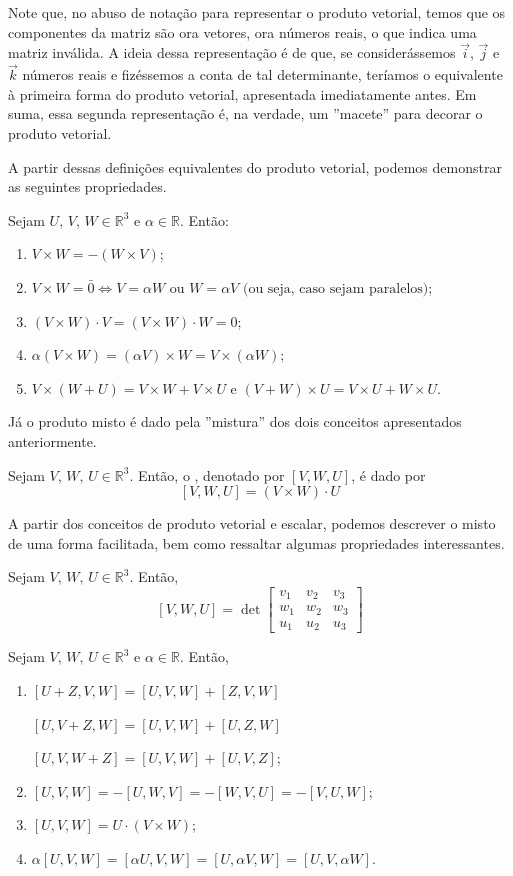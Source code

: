 \documentclass[../main.tex]{subfiles}
\begin{document}
		Note que, no abuso de notação para representar o produto vetorial, temos que os componentes da matriz são ora vetores, ora números reais, o que indica uma matriz inválida. A ideia dessa representação é de que, se considerássemos $\vec i$, $\vec j$ e $\vec k$ números reais e fizéssemos a conta de tal determinante, teríamos o equivalente à primeira forma do produto vetorial, apresentada imediatamente antes. Em suma, essa segunda representação é, na verdade, um ''macete'' para decorar o produto vetorial.
		
		A partir dessas definições equivalentes do produto vetorial, podemos demonstrar as seguintes propriedades.
		\begin{proposicao}
			Sejam $U,\, V,\, W\in \mathbb{R}^3$ e $\alpha \in \mathbb{R}$. Então:
			\begin{enumerate}[label=\roman*)]
				\item $V\times W=-(W\times V)$;
				\item $V\times W=\bar{0}\Leftrightarrow V=\alpha W\text{ ou } W=\alpha V \text{ (ou seja, caso sejam paralelos)}$;
				\item $(V\times W)\cdot V=(V\times W)\cdot W=0$;
				\item $\alpha(V\times W)=(\alpha V)\times W=V\times (\alpha W)$;
				\item $V\times (W+U)=V\times W+V\times U$ e $(V+W)\times U=V\times U+W\times U$.
			\end{enumerate}
		\end{proposicao}
		Já o produto misto é dado pela ''mistura'' dos dois conceitos apresentados anteriormente.
		\begin{definicao}
			Sejam $V,\, W, \, U \in \mathbb{R}^3$. Então, o , denotado por $[V, W, U]$, é dado por
			\[
			[V, W, U]=(V\times W)\cdot U
			\]
		\end{definicao}
		A partir dos conceitos de produto vetorial e escalar, podemos descrever o misto de uma forma facilitada, bem como ressaltar algumas propriedades interessantes.
		\begin{proposicao}
			Sejam $V,\, W, \, U \in \mathbb{R}^3$. Então, 
			\[
			[V, W, U]=\det \begin{bmatrix}
				v_1 & v_2 & v_3\\
				w_1 & w_2 & w_3\\
				u_1 & u_2 & u_3
			\end{bmatrix}
			\]
		\end{proposicao}
		\begin{proposicao}
			Sejam $V,\, W, \, U\in \mathbb{R}^3$ e $\alpha \in \mathbb{R}$. Então,
			\begin{enumerate}[label=\roman*)]
				\item $[U+Z,V,W]=[U,V,W]+[Z,V,W]$
				
				$[U,V+Z,W]=[U,V,W]+[U,Z,W]$
				
				$[U,V,W+Z]=[U,V,W]+[U,V,Z]$;
				\item $[U,V,W]=-[U,W,V]=-[W,V,U]=-[V,U,W]$;
				\item $[U,V,W]=U\cdot(V\times W)$;
				\item $\alpha[U, V, W]=[\alpha U, V, W]=[U, \alpha V, W]=[U, V, \alpha W]$.
			\end{enumerate}
		\end{proposicao}
\end{document}
